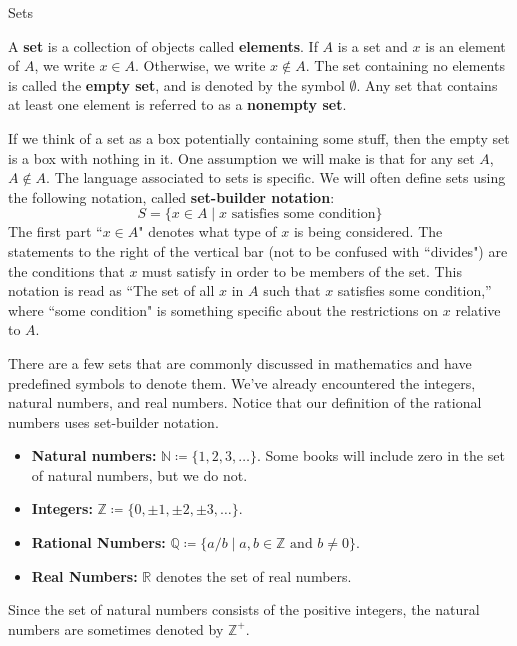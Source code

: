 \begin{section}{Sets}

\begin{definition}
A \textbf{set} is a collection of objects called \textbf{elements}. If $A$ is a set and $x$ is an element of $A$, we write $\boxed{x\in A}$. Otherwise, we write $\boxed{x\notin A}$. The set containing no elements is called the \textbf{empty set}, and is denoted by the symbol $\boxed{\emptyset}$. Any set that contains at least one element is referred to as a \textbf{nonempty set}.
\end{definition}

If we think of a set as a box potentially containing some stuff, then the empty set is a box with nothing in it. One assumption we will make is that for any set $A$, $A\notin A$. The language associated to sets is specific.  We will often define sets using the following notation, called \textbf{set-builder notation}:
\[
\boxed{S=\{x \in A\mid x \mbox{ satisfies some condition}\}}
\]
The first part ``$x \in A$" denotes what type of $x$ is being considered.  The statements to the right of the vertical bar (not to be confused with ``divides") are the conditions that $x$ must satisfy in order to be members of the set.  This notation is read as ``The set of all $x$ in $A$ such that $x$ satisfies some condition,'' where ``some condition" is something specific about the restrictions on $x$ relative to $A$.

There are a few sets that are commonly discussed in mathematics and have predefined symbols to denote them. We've already encountered the integers, natural numbers, and real numbers. Notice that our definition of the rational numbers uses set-builder notation.
\begin{itemize}
\item \textbf{Natural numbers:} $\boxed{\mathbb{N}\coloneqq \{1,2,3,\ldots\}}$. Some books will include zero in the set of natural numbers, but we do not.
\item \textbf{Integers:} $\boxed{\mathbb{Z}\coloneqq \{0, \pm 1, \pm2, \pm 3, \ldots\}}$.
\item \textbf{Rational Numbers:} $\boxed{\mathbb{Q}\coloneqq \{a/b \mid a, b \in \mathbb{Z} \text{ and } b \neq 0\}}$.
\item \textbf{Real Numbers:} $\boxed{\mathbb{R}}$ denotes the set of real numbers.
\end{itemize}
Since the set of natural numbers consists of the positive integers, the natural numbers are sometimes denoted by $\mathbb{Z}^+$.


\end{section}
